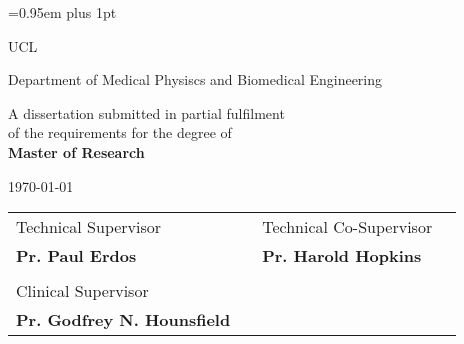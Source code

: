 \begin{titlepage}

\pagestyle{empty}


\vspace*{1.5cm}

\begin{center}
	{\LARGE{\theauthor}\par}
\end{center}
\vspace{0.6cm}
\begin{center}
        {\huge\baselineskip=0.95em plus 1pt \expandafter{
        \textbf{\thetitle}
        \par}}
\end{center}


\vspace{3cm}

\begin{center}
	\LARGE{\expandafter{\textrm{UCL}}}\par
	\expandafter{\Large{Department of Medical Physiscs and Biomedical Engineering}\par}
\end{center}

\vspace{1.5cm}

\begin{center}
	A dissertation submitted in partial fulfilment 
	\\
	of the requirements for the degree of
	\\ 
	\textbf{Master of Research}	
\end{center}

\vspace{0.2cm}
\begin{center}
	\today
\end{center}

\vspace{1.0cm}

\begin{center}
\begin{tabular}{l p{3.3cm} l l}
	
Technical Supervisor & & Technical Co-Supervisor \\
\textbf{Pr. Paul Erdos} & & \textbf{Pr. Harold Hopkins}  \\
 & & \\
Clinical Supervisor & & \\
\textbf{Pr. Godfrey N. Hounsfield} & & 
	
\end{tabular}
\end{center}

\end{titlepage} 